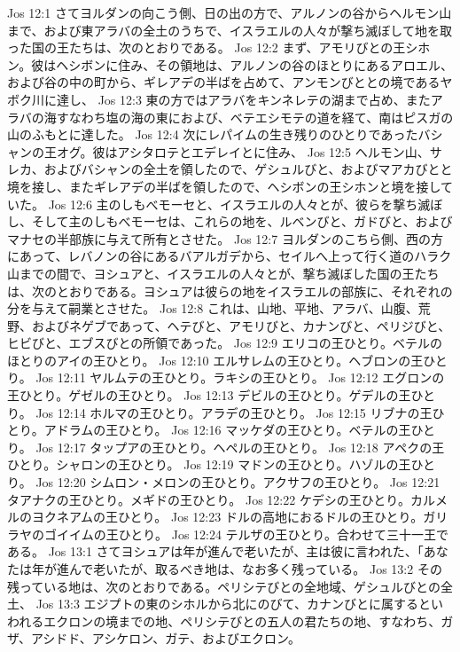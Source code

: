 Jos 12:1  さてヨルダンの向こう側、日の出の方で、アルノンの谷からヘルモン山まで、および東アラバの全土のうちで、イスラエルの人々が撃ち滅ぼして地を取った国の王たちは、次のとおりである。
Jos 12:2  まず、アモリびとの王シホン。彼はヘシボンに住み、その領地は、アルノンの谷のほとりにあるアロエル、および谷の中の町から、ギレアデの半ばを占めて、アンモンびととの境であるヤボク川に達し、
Jos 12:3  東の方ではアラバをキンネレテの湖まで占め、またアラバの海すなわち塩の海の東におよび、ベテエシモテの道を経て、南はピスガの山のふもとに達した。
Jos 12:4  次にレパイムの生き残りのひとりであったバシャンの王オグ。彼はアシタロテとエデレイとに住み、
Jos 12:5  ヘルモン山、サレカ、およびバシャンの全土を領したので、ゲシュルびと、およびマアカびとと境を接し、またギレアデの半ばを領したので、ヘシボンの王シホンと境を接していた。
Jos 12:6  主のしもべモーセと、イスラエルの人々とが、彼らを撃ち滅ぼし、そして主のしもべモーセは、これらの地を、ルベンびと、ガドびと、およびマナセの半部族に与えて所有とさせた。
Jos 12:7  ヨルダンのこちら側、西の方にあって、レバノンの谷にあるバアルガデから、セイルへ上って行く道のハラク山までの間で、ヨシュアと、イスラエルの人々とが、撃ち滅ぼした国の王たちは、次のとおりである。ヨシュアは彼らの地をイスラエルの部族に、それぞれの分を与えて嗣業とさせた。
Jos 12:8  これは、山地、平地、アラバ、山腹、荒野、およびネゲブであって、ヘテびと、アモリびと、カナンびと、ペリジびと、ヒビびと、エブスびとの所領であった。
Jos 12:9  エリコの王ひとり。ベテルのほとりのアイの王ひとり。
Jos 12:10  エルサレムの王ひとり。ヘブロンの王ひとり。
Jos 12:11  ヤルムテの王ひとり。ラキシの王ひとり。
Jos 12:12  エグロンの王ひとり。ゲゼルの王ひとり。
Jos 12:13  デビルの王ひとり。ゲデルの王ひとり。
Jos 12:14  ホルマの王ひとり。アラデの王ひとり。
Jos 12:15  リブナの王ひとり。アドラムの王ひとり。
Jos 12:16  マッケダの王ひとり。ベテルの王ひとり。
Jos 12:17  タップアの王ひとり。ヘペルの王ひとり。
Jos 12:18  アペクの王ひとり。シャロンの王ひとり。
Jos 12:19  マドンの王ひとり。ハゾルの王ひとり。
Jos 12:20  シムロン・メロンの王ひとり。アクサフの王ひとり。
Jos 12:21  タアナクの王ひとり。メギドの王ひとり。
Jos 12:22  ケデシの王ひとり。カルメルのヨクネアムの王ひとり。
Jos 12:23  ドルの高地におるドルの王ひとり。ガリラヤのゴイイムの王ひとり。
Jos 12:24  テルザの王ひとり。合わせて三十一王である。
Jos 13:1  さてヨシュアは年が進んで老いたが、主は彼に言われた、「あなたは年が進んで老いたが、取るべき地は、なお多く残っている。
Jos 13:2  その残っている地は、次のとおりである。ペリシテびとの全地域、ゲシュルびとの全土、
Jos 13:3  エジプトの東のシホルから北にのびて、カナンびとに属するといわれるエクロンの境までの地、ペリシテびとの五人の君たちの地、すなわち、ガザ、アシドド、アシケロン、ガテ、およびエクロン。
